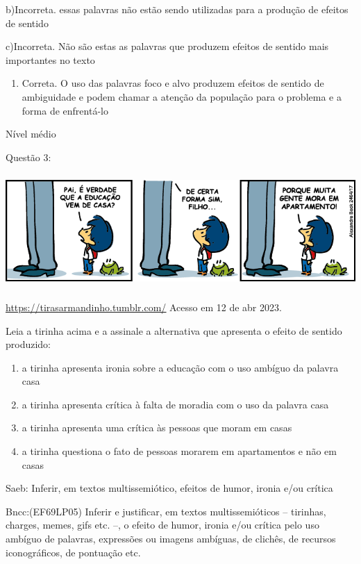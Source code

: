 {b)Incorreta. essas palavras não estão sendo utilizadas para a produção
de efeitos de sentido

c)Incorreta. Não são estas as palavras que produzem efeitos de sentido
mais importantes no texto

\begin{enumerate}
\def\labelenumi{\arabic{enumi}.}
\tightlist
\item
  Correta. O uso das palavras foco e alvo produzem efeitos de sentido de
  ambiguidade e podem chamar a atenção da população para o problema e a
  forma de enfrentá-lo
\end{enumerate}

Nível médio

Questão 3:

\includegraphics[width=5.90551in,height=1.70833in]{./imgSAEB_7_POR/media/image7.png}

\href{https://tirasarmandinho.tumblr.com/}{\uline{https://tirasarmandinho.tumblr.com/}}
Acesso em 12 de abr 2023.

Leia a tirinha acima e a assinale a alternativa que apresenta o efeito
de sentido produzido:

\begin{enumerate}
\def\labelenumi{\alph{enumi})}
\item
  a tirinha apresenta ironia sobre a educação com o uso ambíguo da
  palavra casa
\item
  a tirinha apresenta crítica à falta de moradia com o uso da palavra
  casa
\item
  a tirinha apresenta uma crítica às pessoas que moram em casas
\item
  a tirinha questiona o fato de pessoas morarem em apartamentos e não em
  casas
\end{enumerate}

Saeb: Inferir, em textos multissemiótico, efeitos de humor, ironia e/ou
crítica

Bncc:(EF69LP05) Inferir e justificar, em textos multissemióticos --
tirinhas, charges, memes, gifs etc. --, o efeito de humor, ironia e/ou
crítica pelo uso ambíguo de palavras, expressões ou imagens ambíguas, de
clichês, de recursos iconográficos, de pontuação etc.

}
